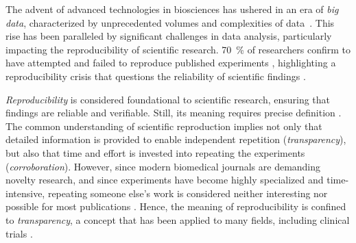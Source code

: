 %
\label{sec:intro_nontransparencies}%
The advent of advanced technologies in biosciences has ushered in an era of
\emph{big data}, characterized by unprecedented volumes and complexities of
data~\cite{bubendorfHighthroughputMicroarrayTechnologies2001,
yangScalabilityValidationBig2017,
ekmekciIntroductionProgrammingBioscientists2016}. This rise has been paralleled
by significant challenges in data analysis, particularly impacting the
reproducibility of scientific research. \SI{70}{\percent} of researchers confirm
to have attempted and failed to reproduce published experiments
\cite{baker500ScientistsLift2016}, highlighting a reproducibility crisis that
questions the reliability of scientific findings
\cite{begleyReproducibilityScienceImproving2015, ioannidisWhyMostPublished2005}.

\emph{Reproducibility} is considered foundational to scientific research,
ensuring that findings are reliable and verifiable. Still, its meaning requires
precise definition \cite{goodmanWhatDoesResearch2016}. The common understanding
of scientific reproduction implies not only that detailed information is
provided to enable independent repetition (\emph{transparency}), but also that
time and effort is invested into repeating the experiments
(\emph{corroboration}). However, since modern biomedical journals are demanding
novelty research, and since experiments have become highly specialized and
time-intensive, repeating someone else's work is considered neither interesting%
nor possible for most publications \cite{flierProblemIrreproducibleBioscience2022,
    pengReproducibleResearchComputational2011}. Hence, the meaning of
reproducibility is confined to \emph{transparency}, a concept that has
been applied to many fields, including clinical trials
\cite{goodmanWhatDoesResearch2016,
    committeeonstrategiesforresponsiblesharingofclinicaltrialdataSharingClinicalTrial2015}.

